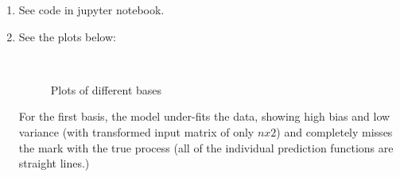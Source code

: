 \documentclass[submit]{harvardml}
\begin{document}
\begin{enumerate}
\item See code in jupyter notebook.
\item See the plots below:

\begin{figure}[h]
\\
\caption{Plots of different bases}
\label{fig:figure}
\end{figure}


For the first basis, the model under-fits the data, showing high bias and low variance (with transformed input matrix of only $nx2$) and completely misses the mark with the true process (all of the individual prediction functions are straight lines.) 


\end{enumerate}
\end{document}
